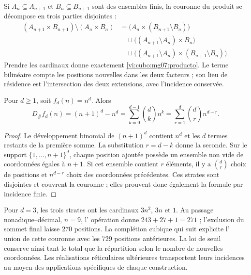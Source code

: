 Si \(A_n\subseteq A_{n+1}\) et \(B_n\subseteq B_{n+1}\) sont des
ensembles finis, la couronne du produit se décompose en trois parties
disjointes :
\[
 \begin{split}
 (A_{n+1}\times B_{n+1})\setminus(A_n\times B_n)
 &=\bigl(A_n\times(B_{n+1}\setminus B_n)\bigr)\\
 &\quad\sqcup\bigl((A_{n+1}\setminus A_n)\times B_n\bigr)\\
 &\quad\sqcup\bigl((A_{n+1}\setminus A_n)
                 \times(B_{n+1}\setminus B_n)\bigr).
 \end{split}
\]
Prendre les cardinaux donne exactement \eqref{vi:cubo:mg07:producto}. Le terme
bilinéaire compte les positions nouvelles dans les deux facteurs ; son lieu de résidence
est l'intersection des deux extensions, avec l'incidence conservée.

\begin{proposition}
Pour \(d\geq1\), soit \(f_d(n)=n^d\). Alors
\begin{equation}
 D_\#f_d(n)=(n+1)^d-n^d
 =\sum_{k=0}^{d-1}\binom dk n^k
 =\sum_{r=1}^{d}\binom dr n^{d-r}.
 \label{vi:cubo:mg07:binomio}
\end{equation}
\end{proposition}

\begin{proof}
Le développement binomial de \((n+1)^d\) contient \(n^d\) et les \(d\) termes restants de la première somme. La substitution \(r=d-k\) donne la seconde. Sur le support \(\{1,\ldots,n+1\}^d\), chaque position ajoutée possède un ensemble non vide de coordonnées égales à \(n+1\). Si cet ensemble contient \(r\) éléments, il y a \(\binom dr\) choix de positions et \(n^{d-r}\) choix des coordonnées précédentes. Ces strates sont disjointes et couvrent la couronne ; elles prouvent donc également la formule par incidence finie.
\end{proof}

Pour \(d=3\), les trois strates ont les cardinaux \(3n^2\),
\(3n\) et \(1\). Au passage nonadique--décimal, \(n=9\), l'
opération donne \(243+27+1=271\) ; l'exclusion du sommet final laisse
\(270\) positions. La complétion cubique qui suit explicite l'
union de cette couronne avec les \(729\) positions antérieures. La loi
de seuil conserve ainsi tant le total que la répartition selon le nombre
de nouvelles coordonnées. Les réalisations réticulaires ultérieures
transportent leurs incidences au moyen des applications spécifiques de chaque
construction.
